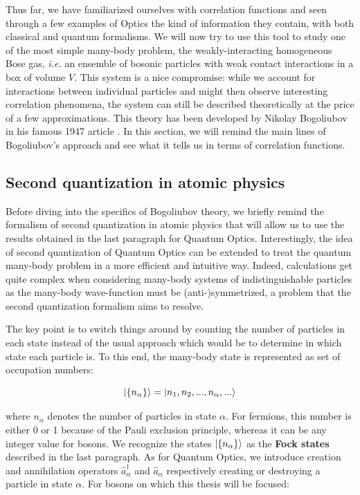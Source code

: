 Thus far, we have familiarized ourselves with correlation functions and seen through a few examples of Optics the kind of information they contain, with both classical and quantum formalisms. We will now try to use this tool to study one of the most simple many-body problem, the weakly-interacting homogeneous Bose gas, {\it i.e.} an ensemble of bosonic particles with weak contact interactions in a box of volume $V$. This system is a nice compromise: while we account for interactions between individual particles and might then observe interesting correlation phenomena, the system can still be described theoretically at the price of a few approximations. This theory has been developed by Nikolay Bogoliubov in his famous 1947 article \cite{bogoliubov1947}. In this section, we will remind the main lines of Bogoliubov's approach and see what it tells us in terms of correlation functions.

\subsection{Second quantization in atomic physics}

Before diving into the specifics of Bogoliubov theory, we briefly remind the formalism of second quantization in atomic physics that will allow us to use the results obtained in the last paragraph for Quantum Optics. Interestingly, the idea of second quantization of Quantum Optics can be extended to treat the quantum many-body problem in a more efficient and intuitive way. Indeed, calculations get quite complex when considering many-body systems of indistinguishable particles as the many-body wave-function must be (anti-)symmetrized, a problem that the second quantization formalism aims to resolve.

The key point is to switch things around by counting the number of particles in each state instead of the usual approach which would be to determine in which state each particle is. To this end, the many-body state is represented as set of occupation numbers:

\begin{equation}
   \ket{ \{n_{\alpha}\}} = \ket{n_1,n_2,...,n_{\alpha},...}
\end{equation}

\noindent where $n_{\alpha}$ denotes the number of particles in state $\alpha$. For fermions, this number is either 0 or 1 because of the Pauli exclusion principle, whereas it can be any integer value for bosons. We recognize the states $\ket{ \{n_{\alpha}\}}$ as the \textbf{Fock states} described in the last paragraph. As for Quantum Optics, we introduce creation and annihilation operators $\hat{a}^{\dagger}_{\alpha}$ and $\hat{a}_{\alpha}$ respectively creating or destroying a particle in state $\alpha$. For bosons on which this thesis will be focused:


